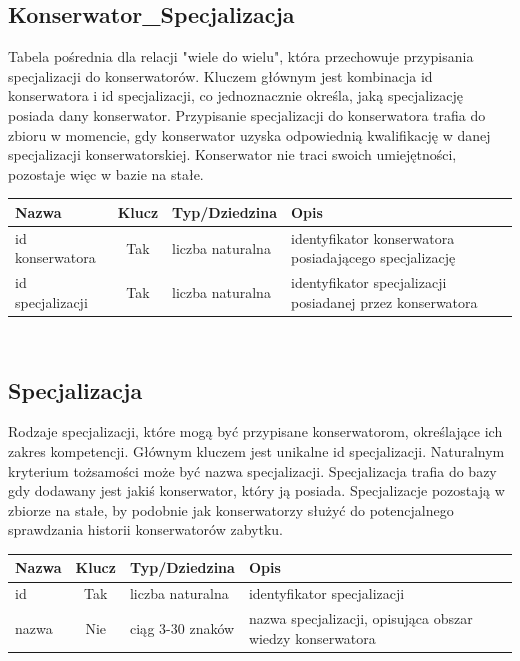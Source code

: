 \documentclass{article}
\begin{document}
\subsection*{Konserwator\_Specjalizacja}
Tabela pośrednia dla relacji "wiele do wielu", która przechowuje przypisania specjalizacji do konserwatorów. Kluczem głównym jest kombinacja id konserwatora i id specjalizacji, co jednoznacznie określa, jaką specjalizację posiada dany konserwator. Przypisanie specjalizacji do konserwatora trafia do zbioru w momencie, gdy konserwator uzyska odpowiednią kwalifikację w danej specjalizacji konserwatorskiej. Konserwator nie traci swoich umiejętności, pozostaje więc w bazie na stałe.  
\begin{longtable}{|C{3cm}|c|C{4.5cm}|C{5cm}|}
\hline
\textbf{Nazwa} & \textbf{Klucz} & \textbf{Typ/Dziedzina} & \textbf{Opis} \\ \hline
id konserwatora & Tak & liczba naturalna & identyfikator konserwatora posiadającego specjalizację \\ \hline
id specjalizacji & Tak & liczba naturalna & identyfikator specjalizacji posiadanej przez konserwatora \\ \hline
\end{longtable}

\subsection*{\\Specjalizacja}
Rodzaje specjalizacji, które mogą być przypisane konserwatorom, określające ich zakres kompetencji. Głównym kluczem jest unikalne id specjalizacji. Naturalnym kryterium tożsamości może być nazwa specjalizacji. Specjalizacja trafia do bazy gdy dodawany jest jakiś konserwator, który ją posiada. Specjalizacje pozostają w zbiorze na stałe, by podobnie jak konserwatorzy służyć do potencjalnego sprawdzania historii konserwatorów zabytku.  
\begin{longtable}{|C{3cm}|c|C{4.5cm}|C{5cm}|}
\hline
\textbf{Nazwa} & \textbf{Klucz} & \textbf{Typ/Dziedzina} & \textbf{Opis} \\ \hline
id & Tak & liczba naturalna & identyfikator specjalizacji \\ \hline
nazwa & Nie & ciąg 3-30 znaków & nazwa specjalizacji, opisująca obszar wiedzy konserwatora \\ \hline
\end{longtable}

\vspace{16\baselineskip}
\end{document}
